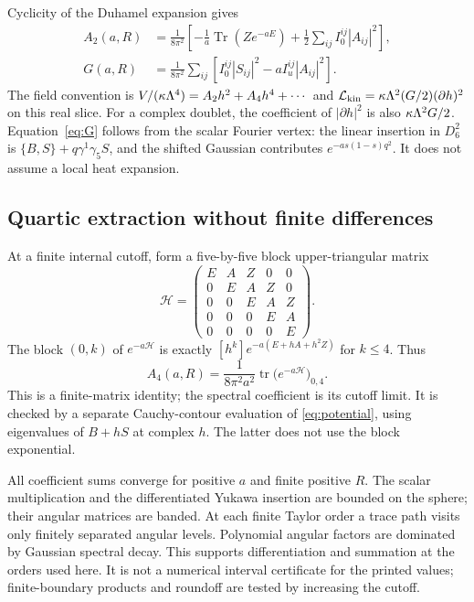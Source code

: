 \documentclass[11pt,letterpaper]{article}
\DeclareMathOperator{\Tr}{Tr}\DeclareMathOperator{\diag}{diag}
\DeclareMathOperator{\tr}{tr}\DeclareMathOperator{\spec}{spec}
\newcommand{\HH}{\mathcal H}\newcommand{\kk}{\mathsf K}
\begin{document}
Cyclicity of the Duhamel expansion \cite{Iochum} gives
\begin{align}
 A_2(a,R)&=\frac1{8\pi^2}\left[-\frac1a\Tr(Z e^{-aE})+
       \frac12\sum_{ij}I_0^{ij}|A_{ij}|^2\right],\label{eq:A2}\\
 G(a,R)&=\frac1{8\pi^2}\sum_{ij}
       \left[I_0^{ij}|S_{ij}|^2-aI_u^{ij}|A_{ij}|^2\right].\label{eq:G}
\end{align}
The field convention is $V/(\kappa\Lambda^4)=A_2h^2+A_4h^4+\cdots$ and $\mathcal L_{\rm kin}=\kappa\Lambda^2(G/2)(\partial h)^2$ on this real slice. For a complex doublet, the coefficient of $|\partial h|^2$ is also $\kappa\Lambda^2G/2$. Equation~\eqref{eq:G} follows from the scalar Fourier vertex: the linear insertion in $D_6^2$ is $\{B,S\}+q\gamma^1\gamma_5S$, and the shifted Gaussian contributes $e^{-as(1-s)q^2}$. It does not assume a local heat expansion.

\subsection{Quartic extraction without finite differences}

At a finite internal cutoff, form a five-by-five block upper-triangular matrix
\begin{equation}
 \HH=\begin{pmatrix}
 E&A&Z&0&0\\0&E&A&Z&0\\0&0&E&A&Z\\0&0&0&E&A\\0&0&0&0&E
 \end{pmatrix}.
 \label{eq:toeplitz}
\end{equation}
The block $(0,k)$ of $e^{-a\HH}$ is exactly $[h^k]e^{-a(E+hA+h^2Z)}$ for $k\le4$. Thus
\begin{equation}
 A_4(a,R)=\frac1{8\pi^2a^2}\tr\bigl(e^{-a\HH}\bigr)_{0,4}.
 \label{eq:A4}
\end{equation}
This is a finite-matrix identity; the spectral coefficient is its cutoff limit. It is checked by a separate Cauchy-contour evaluation of \eqref{eq:potential}, using eigenvalues of $B+hS$ at complex $h$. The latter does not use the block exponential.

All coefficient sums converge for positive $a$ and finite positive $R$. The scalar multiplication and the differentiated Yukawa insertion are bounded on the sphere; their angular matrices are banded. At each finite Taylor order a trace path visits only finitely separated angular levels. Polynomial angular factors are dominated by Gaussian spectral decay. This supports differentiation and summation at the orders used here. It is not a numerical interval certificate for the printed values; finite-boundary products and roundoff are tested by increasing the cutoff.
\end{document}
